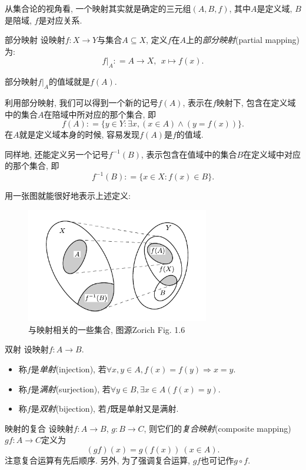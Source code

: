 从集合论的视角看, 一个映射其实就是确定的三元组$(A, B, f)$, 其中$A$是定义域, $B$是陪域, $f$是对应关系.

\begin{definition}{部分映射}
	设映射$f: X \to Y$与集合$A \subseteq X$, 定义$f$在$A$上的\textit{部分映射}(partial mapping)为: $$f|_A : = A \to X, ~~x \mapsto f(x).$$
\end{definition}
\begin{remark}
	部分映射$f|_A$的值域就是$f(A)$.
\end{remark}

利用部分映射, 我们可以得到一个新的记号$f(A)$, 表示在$f$映射下, 包含在定义域中的集合$A$在陪域中所对应的那个集合, 即$$f(A) : = \{ y \in Y: \exists x,  (x \in A) \wedge (y=f(x)) \}.$$
在$A$就是定义域本身的时候, 容易发现$f(A)$是$f$的值域.

同样地, 还能定义另一个记号$f^{-1}(B)$, 表示包含在值域中的集合$B$在定义域中对应的那个集合, 即$$f^{-1}(B) : = \{ x \in X: f(x) \in B \}.$$

用一张图就能很好地表示上述定义: 

\begin{figure}[h!]
	\centering
	\includegraphics[width=8cm]{attachment/Acr1745354698752707434.pdf}
	\caption{与映射相关的一些集合, 图源Zorich Fig. 1.6}
\end{figure}

\begin{definition}{双射}
	设映射$f: A \to B$.
	\begin{itemize}
		\item 称$f$是\textit{单射}(injection), 若$\forall x,y \in A, f(x)=f(y) \Rightarrow x=y$. 
		\item 称$f$是\textit{满射}(surjection), 若$\forall y \in B, \exists x \in A(f(x)=y)$. 
		\item 称$f$是\textit{双射}(bijection), 若$f$既是单射又是满射. 
	\end{itemize}
\end{definition}

\begin{definition}{映射的复合}
    设映射$f: A \to B$, $g: B \to C$, 则它们的\textit{复合映射}(composite mapping)~$gf: A \to C$定义为$$(gf)(x)=g(f(x)) \ (x \in A).$$
    注意复合运算有先后顺序. 另外, 为了强调复合运算, $gf$也可记作$g \circ f$.
\end{definition}

